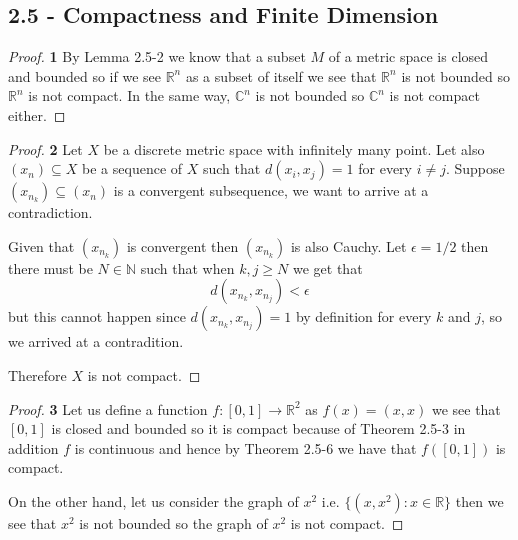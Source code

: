 \documentclass[11pt]{article}
\newcommand{\N}{\mathbb{N}}
\newcommand{\R}{\mathbb{R}}
\newcommand{\C}{\mathbb{C}}
\theoremstyle{definition}
\begin{document}
\subsection*{2.5 - Compactness and Finite Dimension}
\begin{proof}{\textbf{1}}
    By Lemma 2.5-2 we know that a subset $M$ of a metric space is closed
    and bounded so if we see $\R^n$ as a subset of itself we see that 
    $\R^n$ is not bounded so $\R^n$ is not compact. In the same way,
    $\C^n$ is not bounded so $\C^n$ is not compact either.
\end{proof}
\begin{proof}{\textbf{2}}
    Let $X$ be a discrete metric space with infinitely many point.
    Let also $(x_n) \subseteq X$ be a sequence of $X$ such that $d(x_i, x_j) = 1$
    for every $i \neq j$.
    Suppose $(x_{n_k}) \subseteq (x_n)$ is a convergent
    subsequence, we want to arrive at a contradiction.
    
    Given that $(x_{n_k})$ is convergent then $(x_{n_k})$ is also Cauchy.
    Let $\epsilon = 1/2$ then there must be $N \in \N$ such that
    when $k,j \geq N$ we get that
    $$d(x_{n_k}, x_{n_j}) < \epsilon$$
    but this cannot happen since $d(x_{n_k}, x_{n_j}) = 1$ by definition
    for every $k$ and $j$, so we arrived at a contradition.

    Therefore $X$ is not compact.
\end{proof}
\cleardoublepage
\begin{proof}{\textbf{3}}
    Let us define a function $f:[0,1] \to \R^2$ as $f(x) = (x, x)$ we see that
    $[0,1]$ is closed and bounded so it is compact because of Theorem 2.5-3
    in addition $f$ is continuous and hence by Theorem 2.5-6 we have
    that $f([0,1])$ is compact.

    On the other hand, let us consider the graph of $x^2$ i.e.
    $\{(x, x^2): x \in \R\}$ then we see that $x^2$ is not bounded so the
    graph of $x^2$ is not compact.
\end{proof}
\end{document}
